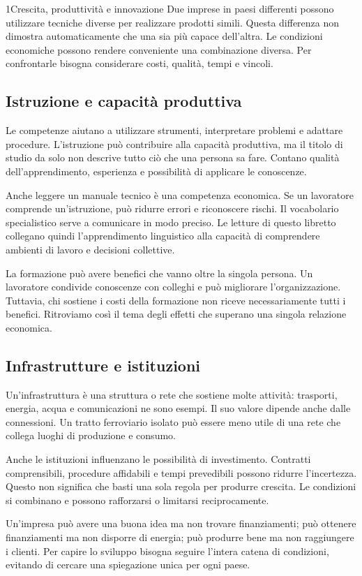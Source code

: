 \begin{lettura}{1}{Crescita, produttività e innovazione}
Due imprese in paesi differenti possono utilizzare tecniche diverse per realizzare prodotti simili. Questa differenza non dimostra automaticamente che una sia più capace dell'altra. Le condizioni economiche possono rendere conveniente una combinazione diversa. Per confrontarle bisogna considerare costi, qualità, tempi e vincoli.

\subsection*{Istruzione e capacità produttiva}
Le competenze aiutano a utilizzare strumenti, interpretare problemi e adattare procedure. L'istruzione può contribuire alla capacità produttiva, ma il titolo di studio da solo non descrive tutto ciò che una persona sa fare. Contano qualità dell'apprendimento, esperienza e possibilità di applicare le conoscenze.

Anche leggere un manuale tecnico è una competenza economica. Se un lavoratore comprende un'istruzione, può ridurre errori e riconoscere rischi. Il vocabolario specialistico serve a comunicare in modo preciso. Le letture di questo libretto collegano quindi l'apprendimento linguistico alla capacità di comprendere ambienti di lavoro e decisioni collettive.

La formazione può avere benefici che vanno oltre la singola persona. Un lavoratore condivide conoscenze con colleghi e può migliorare l'organizzazione. Tuttavia, chi sostiene i costi della formazione non riceve necessariamente tutti i benefici. Ritroviamo così il tema degli effetti che superano una singola relazione economica.

\subsection*{Infrastrutture e istituzioni}
Un'infrastruttura è una struttura o rete che sostiene molte attività: trasporti, energia, acqua e comunicazioni ne sono esempi. Il suo valore dipende anche dalle connessioni. Un tratto ferroviario isolato può essere meno utile di una rete che collega luoghi di produzione e consumo.

Anche le istituzioni influenzano le possibilità di investimento. Contratti comprensibili, procedure affidabili e tempi prevedibili possono ridurre l'incertezza. Questo non significa che basti una sola regola per produrre crescita. Le condizioni si combinano e possono rafforzarsi o limitarsi reciprocamente.

Un'impresa può avere una buona idea ma non trovare finanziamenti; può ottenere finanziamenti ma non disporre di energia; può produrre bene ma non raggiungere i clienti. Per capire lo sviluppo bisogna seguire l'intera catena di condizioni, evitando di cercare una spiegazione unica per ogni paese.


\end{lettura}
